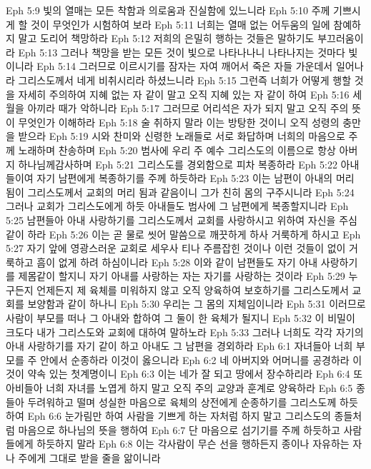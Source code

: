 Eph 5:9  빛의 열매는 모든 착함과 의로움과 진실함에 있느니라
Eph 5:10  주께 기쁘시게 할 것이 무엇인가 시험하여 보라
Eph 5:11  너희는 열매 없는 어두움의 일에 참예하지 말고 도리어 책망하라
Eph 5:12  저희의 은밀히 행하는 것들은 말하기도 부끄러움이라
Eph 5:13  그러나 책망을 받는 모든 것이 빛으로 나타나나니 나타나지는 것마다 빛이니라
Eph 5:14  그러므로 이르시기를 잠자는 자여 깨어서 죽은 자들 가운데서 일어나라 그리스도께서 네게 비취시리라 하셨느니라
Eph 5:15  그런즉 너희가 어떻게 행할 것을 자세히 주의하여 지혜 없는 자 같이 말고 오직 지혜 있는 자 같이 하여
Eph 5:16  세월을 아끼라 때가 악하니라
Eph 5:17  그러므로 어리석은 자가 되지 말고 오직 주의 뜻이 무엇인가 이해하라
Eph 5:18  술 취하지 말라 이는 방탕한 것이니 오직 성령의 충만을 받으라
Eph 5:19  시와 찬미와 신령한 노래들로 서로 화답하며 너희의 마음으로 주께 노래하며 찬송하며
Eph 5:20  범사에 우리 주 예수 그리스도의 이름으로 항상 아버지 하나님께감사하며
Eph 5:21  그리스도를 경외함으로 피차 복종하라
Eph 5:22  아내들이여 자기 남편에게 복종하기를 주께 하듯하라
Eph 5:23  이는 남편이 아내의 머리 됨이 그리스도께서 교회의 머리 됨과 같음이니 그가 친히 몸의 구주시니라
Eph 5:24  그러나 교회가 그리스도에게 하듯 아내들도 범사에 그 남편에게 복종할지니라
Eph 5:25  남편들아 아내 사랑하기를 그리스도께서 교회를 사랑하시고 위하여 자신을 주심 같이 하라
Eph 5:26  이는 곧 물로 씻어 말씀으로 깨끗하게 하사 거룩하게 하시고
Eph 5:27  자기 앞에 영광스러운 교회로 세우사 티나 주름잡힌 것이나 이런 것들이 없이 거룩하고 흠이 없게 하려 하심이니라
Eph 5:28  이와 같이 남편들도 자기 아내 사랑하기를 제몸같이 할지니 자기 아내를 사랑하는 자는 자기를 사랑하는 것이라
Eph 5:29  누구든지 언제든지 제 육체를 미워하지 않고 오직 양육하여 보호하기를 그리스도께서 교회를 보양함과 같이 하나니
Eph 5:30  우리는 그 몸의 지체임이니라
Eph 5:31  이러므로 사람이 부모를 떠나 그 아내와 합하여 그 둘이 한 육체가 될지니
Eph 5:32  이 비밀이 크도다 내가 그리스도와 교회에 대하여 말하노라
Eph 5:33  그러나 너희도 각각 자기의 아내 사랑하기를 자기 같이 하고 아내도 그 남편을 경외하라
Eph 6:1  자녀들아 너희 부모를 주 안에서 순종하라 이것이 옳으니라
Eph 6:2  네 아버지와 어머니를 공경하라 이것이 약속 있는 첫계명이니
Eph 6:3  이는 네가 잘 되고 땅에서 장수하리라
Eph 6:4  또 아비들아 너희 자녀를 노엽게 하지 말고 오직 주의 교양과 훈계로 양육하라
Eph 6:5  종들아 두려워하고 떨며 성실한 마음으로 육체의 상전에게 순종하기를 그리스도께 하듯 하여
Eph 6:6  눈가림만 하여 사람을 기쁘게 하는 자처럼 하지 말고 그리스도의 종들처럼 마음으로 하나님의 뜻을 행하여
Eph 6:7  단 마음으로 섬기기를 주께 하듯하고 사람들에게 하듯하지 말라
Eph 6:8  이는 각사람이 무슨 선을 행하든지 종이나 자유하는 자나 주에게 그대로 받을 줄을 앎이니라
